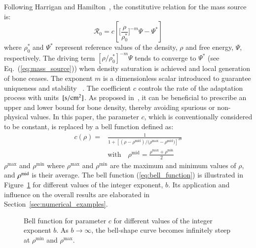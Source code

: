 \documentclass[review]{elsarticle}
\numberwithin{equation}{section}
\begin{document}
Following Harrigan and Hamilton~\citep{Harrigan1993}, the constitutive
relation for the mass source is:
\begin{equation}
\mathcal{R}_{0}=c\left[\Biggl[\frac{\rho}{\rho_{0}^{\ast}}\Biggr]^{-m}\Psi
-\Psi^{\ast}\right]
\label{eq:mass_source}
\end{equation}
where $\rho_0^\ast$ and $\Psi^\ast$ represent reference values of the
density, $\rho$ and free energy, $\Psi$, respectively. The driving term
$\left[ \rho / \rho_0^\ast \right]^{-m}\Psi$ tends to converge to
$\Psi^\ast$ (see Eq.~(\ref{eq:mass_source})) when density saturation is
achieved and local generation of bone ceases. The exponent $m$ is a
dimensionless scalar introduced to guarantee uniqueness and
stability~\citep{Harrigan1993} . The coefficient $c$ controls
the rate of the adaptation process with units~$[\rm{s/cm^2}]$. As proposed
in~\citep{Waffenschmidt2012}, it can be beneficial to prescribe an upper and
lower bound for bone density, thereby avoiding spurious or non-physical
values. In this paper, the parameter $c$, which is conventionally considered 
to be constant, is replaced by a bell function
defined as:
\begin{equation}
\begin{aligned}
c(\rho) = & \frac{1}{1 + \left[  (\rho - \rho^{\mathrm{mid}}) / 
(\rho{^\mathrm{max}} - \rho{^\mathrm{mid})} \right]^{2 b}}\\
& \mathrm{with} \quad \rho^{\mathrm{mid}} = 
\frac{\rho{^\mathrm{max}} + \rho{^\mathrm{min}}}{2}
\end{aligned}
\label{eq:bell_function}
\end{equation}
$\rho^\mathrm{max}$ and $ \rho{^\mathrm{min}}$ where $\rho^\mathrm{max}$
and $\rho^\mathrm{min}$ are the maximum and minimum values of $\rho$, and
$\rho^{\rm {mid}}$ is their average. The bell function
(\ref{eq:bell_function}) is illustrated in Figure~\ref{fig:bell_func} for
different values of the integer exponent, $b$. Its application and influence
on the overall results are elaborated in
Section~\ref{sec:numerical_examples}.
\begin{figure}[!htb]
	\centering
		
		\caption{Bell function for parameter $c$ for different values of the integer exponent $b$. 
		As $b \rightarrow \infty$, the bell-shape curve becomes infinitely steep at 
		$\rho{^\mathrm{min}}$ and $ \rho{^\mathrm{max}}$.}
		\label{fig:bell_func}
\end{figure}
\end{document}
